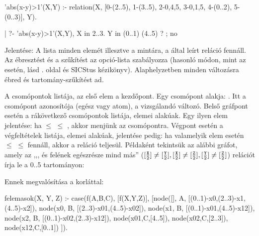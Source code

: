 \begin{prologcode}
'abs(x-y)>1'(X,Y) :-
        relation(X, [0-(2..5), 1-(3..5), 2-{0,4,5},
                     3-{0,1,5}, 4-(0..2), 5-(0..3)], Y).

| ?- 'abs(x-y)>1'(X,Y), X in 2..3.
Y in (0..1) \/ (4..5) ? ;
no
\end{prologcode}

\medskip
{}

Jelentése: A  lista minden elemét illesztve a 
mintára, a  által leírt reláció fennáll. Az ébresztést és a
szűkítést az  opció-lista szabályozza (hasonló módon, mint
az  esetén, lásd \pageref{all_distinct}. oldal és
SICStus kézikönyv). Alaphelyzetben minden változásra ébred és
tartomány-szűkítést ad.

A  csomópontok listája, az első elem a kezdőpont. Egy csomópont
alakja: . Itt  a csomópont azonosítója
(egész vagy atom),  a vizsgálandó változó. Belső gráfpont esetén
 a rákövetkező csomópontok listája, elemei 
alakúak. Egy ilyen elem jelentése: ha  $\leq$  $\leq$ ,
akkor menjünk az  csomópontra. Végpont esetén  a
végfeltételek listája, elemei  alakúak, jelentése pedig: ha
valamelyik elem esetén  $\leq$  $\leq$  fennáll, akkor
a reláció teljesül.
\br
Példaként tekintsük az alábbi gráfot, amely az ,,,  és 
felének egészrésze mind más'' (\([\frac{\texttt{X}}{\texttt{2}}]\neq[\frac{\texttt{Y}}{\texttt{2}}],
[\frac{\texttt{X}}{\texttt{2}}]\neq[\frac{\texttt{Z}}{\texttt{2}}],
[\frac{\texttt{Y}}{\texttt{2}}]\neq[\frac{\texttt{Z}}{\texttt{2}}]\)) relációt írja le a 0..5
tartományon:

\begin{center}\end{center}

Ennek megvalósítása a  korláttal:

\begin{prologcode}
felemasok(X, Y, Z) :-
   case(f(A,B,C), [f(X,Y,Z)],
        [node([], A, [(0..1)-x0,(2..3)-x1,(4..5)-x2]),
         node(x0, B, [(2..3)-x01,(4..5)-x02]),
         node(x1, B, [(0..1)-x01,(4..5)-x12]),
         node(x2, B, [(0..1)-x02,(2..3)-x12]),
         node(x01,C,[4..5]), node(x02,C,[2..3]), node(x12,C,[0..1])
        ]).
\end{prologcode}

